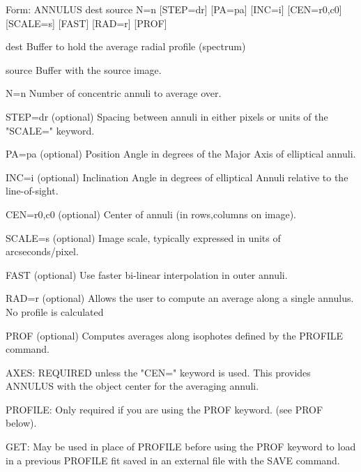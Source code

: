 {\newpage\clearpage
{}%
\begin{command}
  \item[Form: ANNULUS dest source N=n {[STEP=dr]} {[PA=pa]} {[INC=i]} 
       {[CEN=r0,c0]} {[SCALE=s]} {[FAST]} {[RAD=r]} {[PROF]}\hfill]{}
  \item[dest]{Buffer to hold the average radial profile (spectrum)}
  \item[source]{Buffer with the source image.}
  \item[N=n]{Number of concentric annuli to average over.}
  \item[STEP=dr]{(optional) Spacing between annuli in either pixels or
       units of the "SCALE=" keyword.}
  \item[PA=pa]{(optional) Position Angle in degrees of the Major Axis 
       of elliptical annuli.}
  \item[INC=i]{(optional) Inclination Angle in degrees of elliptical 
       Annuli relative to the line-of-sight.}
  \item[CEN=r0,c0]{(optional) Center of annuli (in rows,columns on image).}
  \item[SCALE=s]{(optional) Image scale, typically expressed in units
       of arcseconds/pixel.}
  \item[FAST]{(optional) Use faster bi-linear interpolation in outer annuli.}
  \item[RAD=r]{(optional) Allows the user to compute an average along
       a single annulus.  No profile is calculated}
  \item[PROF]{(optional) Computes averages along isophotes defined by
       the PROFILE command.}
\end{command}%
\lthtmlfigureZ
\lthtmlcheckvsize\clearpage}

{\newpage\clearpage
{}%
\begin{hanging}
  \item{AXES: REQUIRED unless the "CEN=" keyword is used.  This provides
        ANNULUS with the object center for the averaging annuli. }
\par\item{PROFILE: Only required if you are using the PROF keyword. (see PROF
        below).}
\par\item{GET: May be used in place of PROFILE before using the PROF keyword
        to load in a previous PROFILE fit saved in an external file with
        the SAVE command. }
\end{hanging}%
\lthtmlfigureZ
\lthtmlcheckvsize\clearpage}

